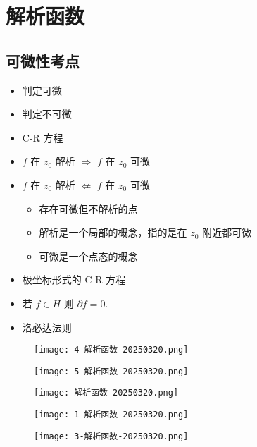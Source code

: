 \section{解析函数}

\subsection{可微性考点}

\begin{itemize}
	\item 判定可微
	\item 判定不可微
	\item C-R 方程
	\item $f$ 在 $z_0$ 解析 $\Rightarrow$ $f$ 在 $z_0$ 可微
	\item $f$ 在 $z_0$ 解析 $\not\Leftarrow$ $f$ 在 $z_0$ 可微
	\begin{itemize}
		\item 存在可微但不解析的点
		\item 解析是一个局部的概念，指的是在 $z_0$ 附近都可微
		\item 可微是一个点态的概念
	\end{itemize}
	\item 极坐标形式的 C-R 方程
	\item 若 $f\in H$ 则 $\overline{\partial}f=0$.
	\item 洛必达法则
\end{itemize}

\begin{exercise}[在 $z_0$ 可微但不解析]
\begin{figure}[H]
\centering
\texttt{[image: 4-解析函数-20250320.png]}
\label{}
\end{figure}
\end{exercise}
\begin{figure}[H]
\centering
\texttt{[image: 5-解析函数-20250320.png]}
\label{}
\end{figure}

\begin{remark}
\begin{figure}[H]
\centering
\texttt{[image: 解析函数-20250320.png]}
\label{}
\end{figure}
\begin{figure}[H]
\centering
\texttt{[image: 1-解析函数-20250320.png]}
\label{}
\end{figure}
\end{remark}
\begin{figure}[H]
\centering
\texttt{[image: 3-解析函数-20250320.png]}
\label{}
\end{figure}

